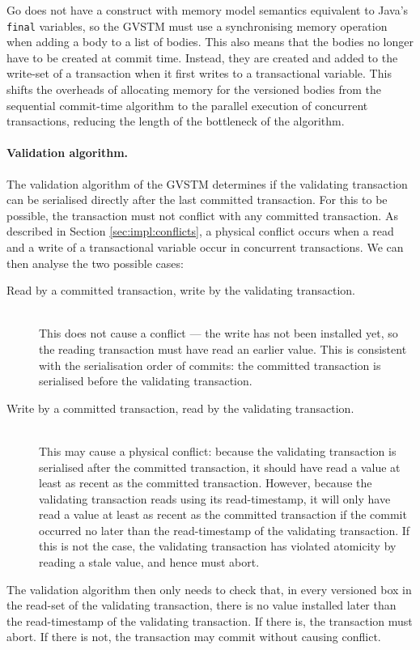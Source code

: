 \documentclass[12pt,a4paper,oneside,openright]{report}
\newcommand{\javaKeyword}[1]{\texttt{#1}}
\begin{document}
Go does not have a construct with memory model semantics equivalent to
Java's \javaKeyword{final} variables, so the GVSTM must use a
synchronising memory operation when adding a body to a list of
bodies. This also means that the bodies no longer have to be created
at commit time. Instead, they are created and added to the write-set
of a transaction when it first writes to a transactional
variable. This shifts the overheads of allocating memory for the
versioned bodies from the sequential commit-time algorithm to the
parallel execution of concurrent transactions, reducing the length of
the bottleneck of the algorithm.

\paragraph{Validation algorithm.} The validation algorithm of the
GVSTM determines if the validating transaction can be serialised
directly after the last committed transaction. For this to be
possible, the transaction must not conflict with any committed
transaction. As described in Section \ref{sec:impl:conflicts}, a
physical conflict occurs when a read and a write of a transactional
variable occur in concurrent transactions. We can then analyse the two
possible cases:

\begin{description}
\item[Read by a committed transaction, write by the validating transaction.] \hfill\\
  This does not cause a conflict --- the write has not been installed
  yet, so the reading transaction must have read an earlier
  value. This is consistent with the serialisation order of commits:
  the committed transaction is serialised before the validating
  transaction.
\item[Write by a committed transaction, read by the validating transaction.] \hfill\\
  This may cause a physical conflict: because the validating
  transaction is serialised after the committed transaction, it should
  have read a value at least as recent as the committed
  transaction. However, because the validating transaction reads using
  its read-timestamp, it will only have read a value at least as
  recent as the committed transaction if the commit occurred no later
  than the read-timestamp of the validating transaction. If this is
  not the case, the validating transaction has violated atomicity by
  reading a stale value, and hence must abort.
\end{description}
The validation algorithm then only needs to check that, in every
versioned box in the read-set of the validating transaction, there is
no value installed later than the read-timestamp of the validating
transaction. If there is, the transaction must abort. If there is not,
the transaction may commit without causing conflict.
\end{document}
